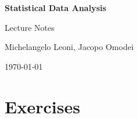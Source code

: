 





\begin{titlepage}
    \centering
    \vspace*{3cm}

    {\Huge\bfseries Statistical Data Analysis \par}
    \vspace{0.5cm}
    {\Large Lecture Notes \par}

    {\large \version}
    
    \vspace{1.5cm}

    {\Large Michelangelo Leoni, Jacopo Omodei \par}

    \vfill

    {\large \today \par}

    \vspace*{2cm}
\end{titlepage}

\frontmatter



\tableofcontents

\mainmatter













\part*{Exercises}
\startexercises


\appendix
\renewcommand{\thechapter}{\Roman{chapter}}




%

\backmatter

\printbibliography[heading=bibintoc]

